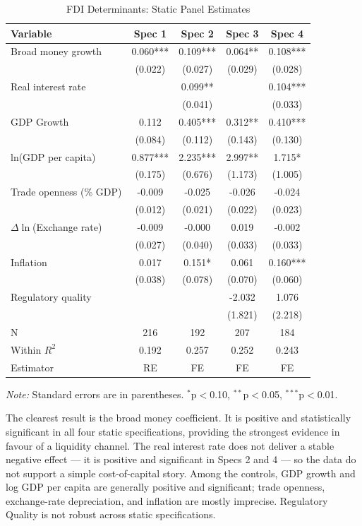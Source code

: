 \begin{table}[htbp]
\centering
\setlength{\tabcolsep}{3pt}
\renewcommand{\arraystretch}{0.95}
\caption{FDI Determinants: Static Panel Estimates}
\label{tab:fresh-static}
\begin{tabular}{lcccc}
\hline\hline
Variable & Spec 1 & Spec 2 & Spec 3 & Spec 4 \\
\hline
Broad money growth & 0.060*** & 0.109*** & 0.064** & 0.108*** \\
 & (0.022) & (0.027) & (0.029) & (0.028) \\
Real interest rate &  & 0.099** &  & 0.104*** \\
 &  & (0.041) &  & (0.033) \\
GDP Growth & 0.112 & 0.405*** & 0.312** & 0.410*** \\
 & (0.084) & (0.112) & (0.143) & (0.130) \\
ln(GDP per capita) & 0.877*** & 2.235*** & 2.997** & 1.715* \\
 & (0.175) & (0.676) & (1.173) & (1.005) \\
Trade openness (\% GDP) & -0.009 & -0.025 & -0.026 & -0.024 \\
 & (0.012) & (0.021) & (0.022) & (0.023) \\
$\Delta \ln$(Exchange rate) & -0.009 & -0.000 & 0.019 & -0.002 \\
 & (0.027) & (0.040) & (0.033) & (0.033) \\
Inflation & 0.017 & 0.151* & 0.061 & 0.160*** \\
 & (0.038) & (0.078) & (0.070) & (0.060) \\
Regulatory quality &  &  & -2.032 & 1.076 \\
 &  &  & (1.821) & (2.218) \\
N & 216 & 192 & 207 & 184 \\
Within $R^2$ & 0.192 & 0.257 & 0.252 & 0.243 \\
Estimator & RE & FE & FE & FE \\
\hline\hline
\end{tabular}%
\par\noindent\textit{Note:} Standard errors are in parentheses. $^{*}$p$<$0.10, $^{**}$p$<$0.05, $^{***}$p$<$0.01.
\end{table}

The clearest result is the broad money coefficient. It is positive and statistically significant in all four static specifications, providing the strongest evidence in favour of a liquidity channel. The real interest rate does not deliver a stable negative effect --- it is positive and significant in Specs 2 and 4 --- so the data do not support a simple cost-of-capital story. Among the controls, GDP growth and log GDP per capita are generally positive and significant; trade openness, exchange-rate depreciation, and inflation are mostly imprecise. Regulatory Quality is not robust across static specifications.

